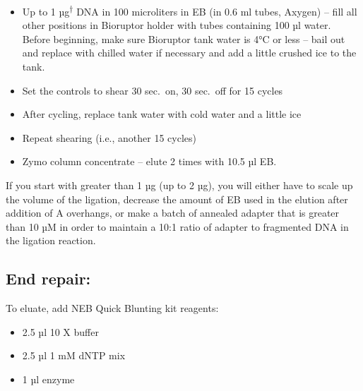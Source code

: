 \documentclass[
  letterpaper,
  DIV=11,
  numbers=noendperiod]{scrreprt}
\providecommand{\tightlist}{%
  \setlength{\itemsep}{0pt}\setlength{\parskip}{0pt}}\usepackage{longtable,booktabs,array}
\begin{document}
\begin{itemize}
\tightlist
\item
  Up to 1 µg\textsuperscript{†} DNA in 100 microliters in EB (in 0.6 ml
  tubes, Axygen) -- fill all other positions in Bioruptor holder with
  tubes containing 100 µl water. Before beginning, make sure Bioruptor
  tank water is 4°C or less -- bail out and replace with chilled water
  if necessary and add a little crushed ice to the tank.
\item
  Set the controls to shear 30 sec.~on, 30 sec.~off for 15 cycles
\item
  After cycling, replace tank water with cold water and a little ice
\item
  Repeat shearing (i.e., another 15 cycles)
\item
  Zymo column concentrate -- elute 2 times with 10.5 µl EB.
\end{itemize}

\begin{tcolorbox}[enhanced jigsaw, rightrule=.15mm, title=\textcolor{quarto-callout-warning-color}{\faExclamationTriangle}\hspace{0.5em}{NOTES}, titlerule=0mm, opacitybacktitle=0.6, toprule=.15mm, bottomrule=.15mm, opacityback=0, left=2mm, colframe=quarto-callout-warning-color-frame, breakable, coltitle=black, colback=white, colbacktitle=quarto-callout-warning-color!10!white, bottomtitle=1mm, leftrule=.75mm, toptitle=1mm, arc=.35mm]

If you start with greater than 1 µg (up to 2 µg), you will either have
to scale up the volume of the ligation, decrease the amount of EB used
in the elution after addition of A overhangs, or make a batch of
annealed adapter that is greater than 10 µM in order to maintain a 10:1
ratio of adapter to fragmented DNA in the ligation reaction.

\end{tcolorbox}

\hypertarget{end-repair}{%
\subsection{End repair:}\label{end-repair}}

To eluate, add NEB Quick Blunting kit reagents:

\begin{itemize}
\tightlist
\item
  2.5 µl 10 X buffer
\item
  2.5 µl 1 mM dNTP mix
\item
  1 µl enzyme
\end{itemize}
\end{document}
